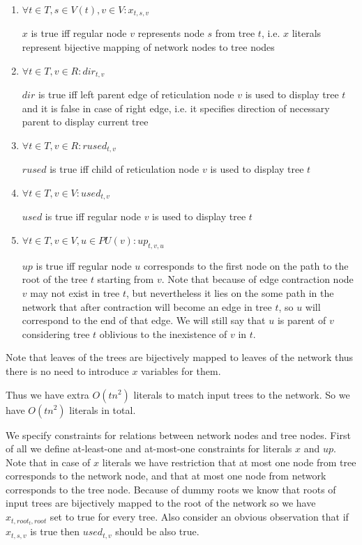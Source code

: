 \documentclass[runningheads, envcountsame, a4paper]{llncs}
\begin{document}
\begin{enumerate}

\item $\forall t \in T, s \in V(t), v \in V : x_{t,s,v}$

$x$ is true iff regular node $v$ represents node $s$ from tree $t$, i.e. $x$ literals represent bijective 
mapping of network nodes to tree nodes

\item $\forall t \in T, v \in R : dir_{t,v}$

$dir$ is true iff left parent edge of reticulation node $v$ is used to display tree $t$ and it is false in case 
of right edge, i.e. it specifies direction of necessary parent to display current tree

\item $\forall t \in T, v \in R : rused_{t,v}$

$rused$ is true iff child of reticulation node $v$ is used to display tree $t$

\item $\forall t \in T, v \in V : used_{t,v}$

$used$ is true iff regular node $v$ is used to display tree $t$

\item $\forall t \in T, v \in V, u \in PU(v) : up_{t,v,u}$

$up$ is true iff regular node $u$ corresponds to the first node on the path to the root of the tree $t$ starting 
from $v$. Note that because of edge contraction node $v$ may not exist in tree $t$, but nevertheless it lies on 
the some path in the network that after contraction will become an edge in tree $t$, so $u$ will correspond to 
the end of that edge. We will still say that $u$ is parent of $v$ considering tree $t$ oblivious to the inexistence of
$v$ in $t$.

\end{enumerate}

Note that leaves of the trees are bijectively mapped to leaves of the network thus there is no need to introduce $x$ variables for them. 

Thus we have extra $O(t n^2)$ literals to match input trees to the network. So we have $O(tn^2)$ literals in total.

We specify constraints for relations between network nodes and tree nodes. 
First of all we define at-least-one and at-most-one constraints for literals $x$ and $up$. Note that in case 
of $x$ literals we have restriction that at most one node from tree corresponds to the network node, and that at 
most one node from network corresponds to the tree node. Because of dummy roots we know that roots of input trees 
are bijectively mapped to the root of the network so we have $x_{t,root_t,root}$ set to true for every tree. Also 
consider an obvious observation that if $x_{t,s,v}$ is true then $used_{t,v}$ should be also true.
\end{document}
